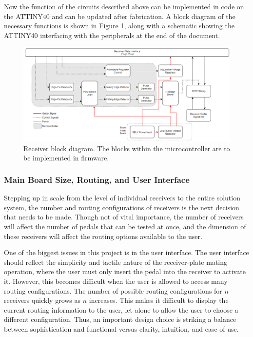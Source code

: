 \documentclass{article}
\begin{document}
		Now the function of the circuits described above can be implemented in code on the ATTINY40 and can be updated after fabrication.  A block diagram of the necessary functions is shown in Figure \ref{fig:MicroBlockDiagram}, along with a schematic showing the ATTINY40 interfacing with the peripherals at the end of the document.

		\begin{figure}
			\centering
			\includegraphics[width = \textwidth]{PR2Images/ReceiverBlockDiagramMCU.PNG}
			\caption{Receiver block diagram.  The blocks within the microcontroller are to be implemented in firmware.}
			\label{fig:MicroBlockDiagram}
		\end{figure}

		\subsubsection{Main Board Size, Routing, and User Interface}
		Stepping up in scale from the level of individual receivers to the entire solution system, the number and routing configurations of receivers is the next decision that needs to be made.  Though not of vital importance, the number of receivers will affect the number of pedals that can be tested at once, and the dimension of these receivers will affect the routing options available to the user.

		One of the biggest issues in this project is in the user interface.  The user interface should reflect the simplicity and tactile nature of the receiver-plate mating operation, where the user must only insert the pedal into the receiver to activate it.  However, this becomes difficult when the user is allowed to access many routing configurations.  The number of possible routing configurations for $n$ receivers quickly grows as $n$ increases.  This makes it difficult to display the current routing information to the user, let alone to allow the user to choose a different configuration.  Thus, an important design choice is striking a balance between sophistication and functional versus clarity, intuition, and ease of use.
\end{document}
